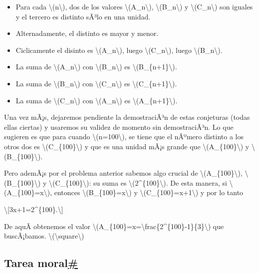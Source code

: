 \documentclass[
]{article}
\begin{document}
\begin{itemize}
\item
  Para cada {\textbackslash(n\textbackslash)}, dos de los valores
  {\textbackslash(A\_n\textbackslash)},
  {\textbackslash(B\_n\textbackslash)} y
  {\textbackslash(C\_n\textbackslash)} son iguales y el tercero es
  distinto sÃ³lo en una unidad.
\item
  Alternadamente, el distinto es mayor y menor.
\item
  Ciclicamente el disinto es {\textbackslash(A\_n\textbackslash)}, luego
  {\textbackslash(C\_n\textbackslash)}, luego
  {\textbackslash(B\_n\textbackslash)}.
\item
  La suma de {\textbackslash(A\_n\textbackslash)} con
  {\textbackslash(B\_n\textbackslash)} es
  {\textbackslash(B\_\{n+1\}\textbackslash)}.
\item
  La suma de {\textbackslash(B\_n\textbackslash)} con
  {\textbackslash(C\_n\textbackslash)} es
  {\textbackslash(C\_\{n+1\}\textbackslash)}.
\item
  La suma de {\textbackslash(C\_n\textbackslash)} con
  {\textbackslash(A\_n\textbackslash)} es
  {\textbackslash(A\_\{n+1\}\textbackslash)}.
\end{itemize}

Una vez mÃ¡s, dejaremos pendiente la demostraciÃ³n de estas conjeturas
(todas ellas ciertas) y usaremos su validez de momento sin
demostraciÃ³n. Lo que sugieren es que para cuando
{\textbackslash(n=100\textbackslash)}, se tiene que el nÃºmero distinto
a los otros dos es {\textbackslash(C\_\{100\}\textbackslash)} y que es
una unidad mÃ¡s grande que {\textbackslash(A\_\{100\}\textbackslash)} y
{\textbackslash(B\_\{100\}\textbackslash)}.

Pero ademÃ¡s por el problema anterior sabemos algo crucial de
{\textbackslash(A\_\{100\}\textbackslash)},
{\textbackslash(B\_\{100\}\textbackslash)} y
{\textbackslash(C\_\{100\}\textbackslash)}: su suma es
{\textbackslash(2\^{}\{100\}\textbackslash)}. De esta manera, si
{\textbackslash(A\_\{100\}=x\textbackslash)}, entonces
{\textbackslash(B\_\{100\}=x\textbackslash)} y
{\textbackslash(C\_\{100\}=x+1\textbackslash)} y por lo tanto

\textbackslash{[}3x+1=2\^{}\{100\}.\textbackslash{]}

De aquÃ­ obtenemos el valor
{\textbackslash(A\_\{100\}=x=\textbackslash frac\{2\^{}\{100\}-1\}\{3\}\textbackslash)}
que buscÃ¡bamos. {{\textbackslash(\textbackslash square\textbackslash)}}

\subsection{\texorpdfstring{Tarea
moral\hyperref[tarea-moral]{\#}}{Tarea moral\#}}\label{tarea-moral}
\end{document}
